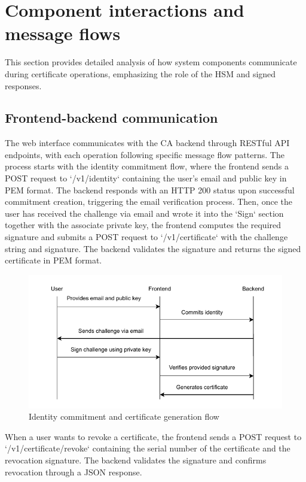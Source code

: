 \section{Component interactions and message flows}

This section provides detailed analysis of how system components communicate during 
certificate operations, emphasizing the role of the HSM and signed responses.

\subsection{Frontend-backend communication}

The web interface communicates with the CA backend through RESTful API endpoints, 
with each operation following specific message flow patterns.
The process starts with the identity commitment flow, where the frontend sends a POST request to 
`/v1/identity` containing the user's email and public key in PEM format. The backend responds with an HTTP 200 status upon successful 
commitment creation, triggering the email verification process.
Then, once the user has received the challenge via email and wrote it into the `Sign` section
together with the associate private key, the frontend computes the required signature and submits 
a POST request to `/v1/certificate` with the challenge string and signature. 
The backend validates the signature and returns the signed certificate in PEM format.
\begin{figure}[h!]
    \centering
    \includegraphics[keepaspectratio, width=\textwidth]{Pic/create_certificate.pdf}
    \caption{Identity commitment and certificate generation flow}
    \label{fig:certificate-creation-flow}
\end{figure}
When a user wants to revoke a certificate, the frontend sends a POST request to 
`/v1/certificate/revoke` containing the serial number of the certificate and the revocation 
signature. The backend validates the signature and confirms revocation through a JSON response.

